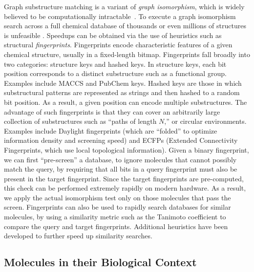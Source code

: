 \documentclass{sig-alternate}
\begin{document}
Graph substructure matching is a variant of \emph{graph isomorphism},
which is widely believed to be computationally
intractable~\cite{cordella2001}. To execute a graph isomorphism search
across a full chemical database of thousands or even millions of
structures is unfeasible \cite{Weininger:2011ly}. Speedups can be
obtained via the use of heuristics such as structural
\emph{fingerprints}. Fingerprints encode characteristic features of a
given chemical structure, usually in a fixed-length
bitmap. Fingerprints fall broadly into two categories: structure keys
and hashed keys. In structure keys, each bit position corresponds to a
distinct substructure such as a functional group. Examples include MACCS and PubChem
keys. Hashed keys are those in which substructural patterns
are represented as strings and then hashed to a random bit
position. As a result, a given position can encode multiple
substructures. The advantage of such fingerprints is that they can
cover an arbitrarily large collection of substructures such as ``paths
of length $N$,'' or circular environments. Examples include Daylight fingerprints (which are ``folded'' to
optimize information density and screening speed) and
ECFPs (Extended Connectivity Fingerprints, which use local topological
information).
Given a binary fingerprint, we can first ``pre-screen'' a database, to
ignore molecules that cannot possibly match the query,
 by requiring that all bits in a query fingerprint must also
be present in the target fingerprint. Since the target fingerprints
are pre-computed, this check can be performed extremely
rapidly on modern hardware. As a result, we apply the actual
isomorphism test only on those molecules that pass the
screen. Fingerprints can also be used to rapidly search databases for
similar molecules, by using a similarity metric such as the
Tanimoto coefficient to compare the query and target
fingerprints. Additional heuristics have been developed
\cite{Swamidass:2007ve} to further speed up similarity searches.

\subsection{Molecules in their Biological Context}
\label{sec:prof-ident}
\end{document}
